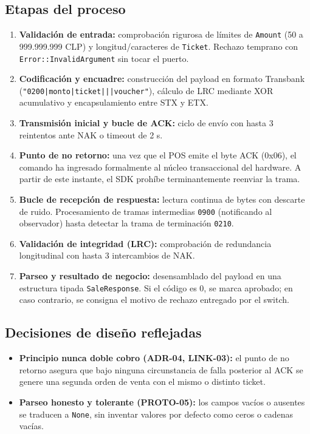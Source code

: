 \documentclass{../../plantilla/raysac-informe}
\begin{document}
\subsection{Etapas del proceso}
\begin{enumerate}
  \item \textbf{Validación de entrada:} comprobación rigurosa de límites de \texttt{Amount} (50 a 999.999.999 CLP)
    y longitud/caracteres de \texttt{Ticket}. Rechazo temprano con \texttt{Error::InvalidArgument} sin tocar el puerto.
  \item \textbf{Codificación y encuadre:} construcción del payload en formato Transbank
    (\texttt{"0200|monto|ticket|||voucher"}), cálculo de LRC mediante XOR acumulativo y encapsulamiento entre STX y ETX.
  \item \textbf{Transmisión inicial y bucle de ACK:} ciclo de envío con hasta 3 reintentos ante NAK o timeout de 2 s.
  \item \textbf{Punto de no retorno:} una vez que el POS emite el byte ACK (0x06), el comando ha ingresado formalmente
    al núcleo transaccional del hardware. A partir de este instante, el SDK prohíbe terminantemente reenviar la trama.
  \item \textbf{Bucle de recepción de respuesta:} lectura continua de bytes con descarte de ruido. Procesamiento de
    tramas intermedias \texttt{0900} (notificando al observador) hasta detectar la trama de terminación \texttt{0210}.
  \item \textbf{Validación de integridad (LRC):} comprobación de redundancia longitudinal con hasta 3 intercambios de NAK.
  \item \textbf{Parseo y resultado de negocio:} desensamblado del payload en una estructura tipada \texttt{SaleResponse}.
    Si el código es 0, se marca aprobado; en caso contrario, se consigna el motivo de rechazo entregado por el switch.
\end{enumerate}

\subsection{Decisiones de diseño reflejadas}
\begin{itemize}
  \item \textbf{Principio nunca doble cobro (ADR-04, LINK-03):} el punto de no retorno asegura que bajo ninguna
    circunstancia de falla posterior al ACK se genere una segunda orden de venta con el mismo o distinto ticket.
  \item \textbf{Parseo honesto y tolerante (PROTO-05):} los campos vacíos o ausentes se traducen a \texttt{None},
    sin inventar valores por defecto como ceros o cadenas vacías.
\end{itemize}
\end{document}
